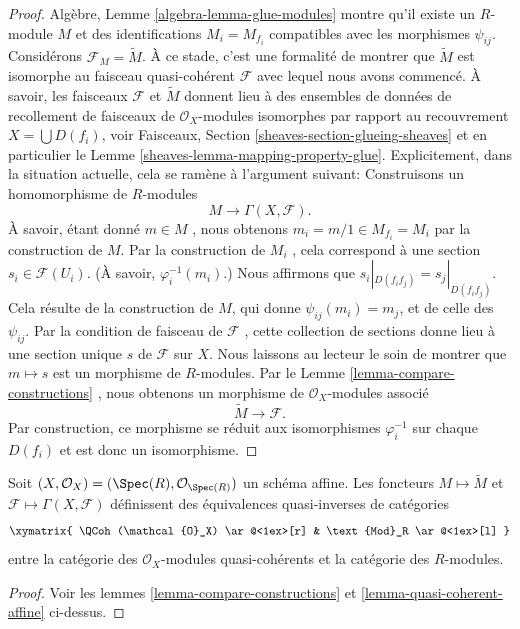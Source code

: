 \begin{proof}
\medskip\noindent
Algèbre, Lemme  \ref{algebra-lemma-glue-modules}  montre qu'il existe un
 $R$-module  $M$  et des identifications  $M_i = M_{f_i}$  compatibles avec les
morphismes  $\psi_{ij}$. Considérons  $\mathcal{F}_M = \widetilde M$. À ce stade, c'est une
formalité de montrer que  $\widetilde M$  est isomorphe au faisceau quasi-cohérent
 $\mathcal{F}$  avec lequel nous avons commencé. À savoir, les faisceaux  $\mathcal{F}$ 
et  $\widetilde M$  donnent lieu à des ensembles de données de recollement de
faisceaux de  $\mathcal{O}_X$-modules isomorphes par rapport au recouvrement
 $X = \bigcup D(f_i)$, voir Faisceaux, Section  \ref{sheaves-section-glueing-sheaves}  et en particulier le Lemme
 \ref{sheaves-lemma-mapping-property-glue}. Explicitement, dans la situation actuelle, cela se ramène à
l'argument suivant: Construisons un homomorphisme de  $R$-modules
$$
M \longrightarrow \Gamma(X, \mathcal{F}).
$$
À savoir, étant donné  $m \in M$ , nous obtenons  $m_i = m/1 \in M_{f_i} = M_i$  par la construction
de  $M$. Par la construction de  $M_i$ , cela correspond à une
section  $s_i \in \mathcal{F}(U_i)$. (À savoir,  $\varphi^{-1}_i(m_i)$.) Nous affirmons que  $s_i|_{D(f_if_j)} = s_j|_{D(f_if_j)}$.
Cela résulte de la construction de  $M$, qui donne  $\psi_{ij}(m_i) = m_j$,
et de celle des  $\psi_{ij}$. Par la condition de faisceau de
 $\mathcal{F}$ , cette collection de sections donne lieu à une section unique
 $s$  de  $\mathcal{F}$  sur  $X$. Nous laissons au lecteur le soin de
montrer que  $m \mapsto s$  est un morphisme de  $R$-modules. Par le Lemme
 \ref{lemma-compare-constructions} , nous obtenons un morphisme de  $\mathcal{O}_X$-modules associé
$$
\widetilde M \longrightarrow \mathcal{F}.
$$
Par construction, ce morphisme se réduit aux isomorphismes  $\varphi_i^{-1}$  sur
chaque  $D(f_i)$  et est donc un isomorphisme.
\end{proof}

\begin{lemma}
\label{lemma-equivalence-quasi-coherent}
Soit  $(X, \mathcal{O}_X) = (\Spec(R), \mathcal{O}_{\Spec(R)})$  un schéma affine. Les foncteurs  $M \mapsto \widetilde M$  et  $\mathcal{F} \mapsto \Gamma(X, \mathcal{F})$ 
définissent des équivalences quasi-inverses de catégories
$$
\xymatrix{
\QCoh(\mathcal{O}_X)
\ar@<1ex>[r]
&
\text{Mod}_R
\ar@<1ex>[l]
}
$$
entre la catégorie des  $\mathcal{O}_X$-modules quasi-cohérents et la catégorie des
 $R$-modules.
\end{lemma}

\begin{proof}
Voir les lemmes  \ref{lemma-compare-constructions}  et  \ref{lemma-quasi-coherent-affine}  ci-dessus.
\end{proof}

